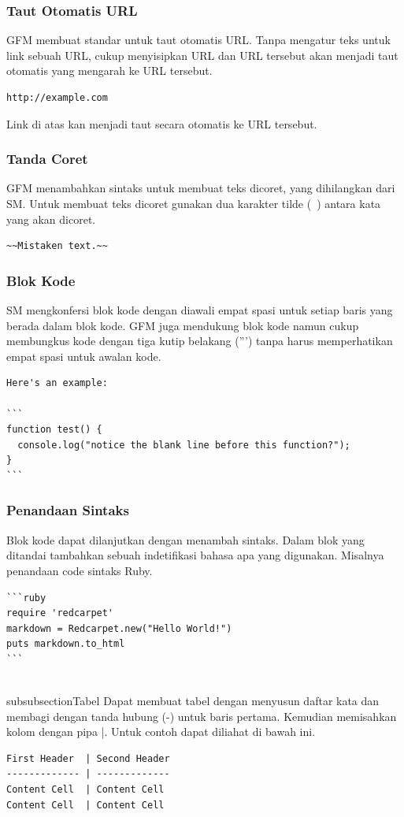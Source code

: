 \begin{enumerate}
\subsubsection{Taut Otomatis URL}
GFM membuat standar untuk taut otomatis URL. Tanpa mengatur teks untuk link sebuah URL, cukup menyisipkan URL dan URL tersebut akan menjadi taut otomatis yang mengarah ke URL tersebut.
\begin{lstlisting}
http://example.com
\end{lstlisting}
Link di atas kan menjadi taut secara otomatis ke URL tersebut.

\subsubsection{Tanda Coret}
GFM menambahkan sintaks untuk membuat teks dicoret, yang dihilangkan dari SM. Untuk membuat teks dicoret gunakan dua karakter tilde (~) antara kata yang akan dicoret.
\begin{lstlisting}
~~Mistaken text.~~
\end{lstlisting}

\subsubsection{Blok Kode}
SM mengkonfersi blok kode dengan diawali empat spasi untuk setiap baris yang berada dalam blok kode. GFM juga mendukung blok kode namun cukup membungkus kode dengan tiga kutip belakang (''') tanpa harus memperhatikan empat spasi untuk awalan kode.
\begin{lstlisting}
Here's an example:

```
function test() {
  console.log("notice the blank line before this function?");
}
```
\end{lstlisting}

\subsubsection{Penandaan Sintaks}
Blok kode dapat dilanjutkan dengan menambah sintaks. Dalam blok yang ditandai tambahkan sebuah indetifikasi bahasa apa yang digunakan. Misalnya penandaan code sintaks Ruby.
\begin{lstlisting}
```ruby
require 'redcarpet'
markdown = Redcarpet.new("Hello World!")
puts markdown.to_html
```
\end{lstlisting}

\\subsubsection{Tabel}
Dapat membuat tabel dengan menyusun daftar kata dan membagi dengan tanda hubung (-) untuk baris pertama. Kemudian memisahkan kolom dengan pipa |. Untuk contoh dapat diliahat di bawah ini.
\begin{lstlisting}
First Header  | Second Header
------------- | -------------
Content Cell  | Content Cell
Content Cell  | Content Cell
\end{lstlisting}


\end{enumerate}
